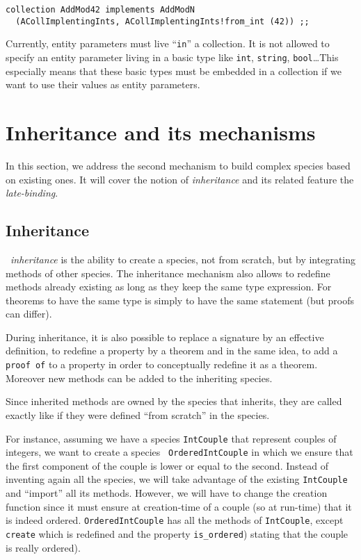  {\scriptsize
\begin{lstlisting}
collection AddMod42 implements AddModN
  (ACollImplentingInts, ACollImplentingInts!from_int (42)) ;;
\end{lstlisting}
}


\smallskip

 Currently, entity parameters must live ``{\tt in}'' a
collection. It is not allowed to specify an entity parameter living in
a basic type like {\tt int}, {\tt string}, {\tt bool}\ldots This
especially means that these basic types must be embedded in a
collection if we want to use  their values  as  entity parameters.



\section{Inheritance and its mechanisms}
In this section, we address the second mechanism to build complex species
based on existing ones. It will cover the notion of {\em inheritance}
and its related feature the {\em late-binding}.



\subsection{Inheritance}
\label{inheritance}
 \focal\ {\em inheritance} is the ability to create
a species, not from scratch, but by integrating methods of other
species.  The inheritance mechanism also allows to redefine methods
already existing as long as they keep the same type expression.  For
theorems to have the same type is simply to have the same statement
(but proofs can differ).

During inheritance, it is also possible to replace a signature by an
effective definition, to redefine a property by a theorem and in the
same idea, to add a {\tt proof of} to a property in order to
conceptually redefine it as a theorem. Moreover new methods can be
added to the inheriting species.

Since inherited methods are
owned by the species that inherits, they are called exactly like if
they were defined ``from scratch'' in the species.

For instance, assuming we have a species {\tt IntCouple} that
represent couples of integers, we want to create a species {\tt
  OrderedIntCouple} in which we ensure that the first component of the
couple is lower or equal to the second. Instead of inventing again all
the species, we will take advantage of the existing {\tt IntCouple}
and ``import'' all its methods. However, we will have to change the
creation function since it must ensure at creation-time of a couple
(so at run-time) that it is indeed ordered.  {\tt OrderedIntCouple}
has all the methods of {\tt IntCouple}, except {\tt create} which is
redefined and the property {\tt is\_ordered}) stating that the couple
is really ordered).

